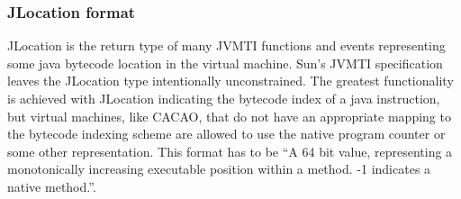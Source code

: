 
\subsubsection{JLocation format}
\label{jlocation}
JLocation is the return type of many JVMTI functions and events representing some java bytecode location in the virtual machine. Sun's JVMTI specification\cite{jvmti} leaves the JLocation type intentionally unconstrained. The greatest functionality is achieved with JLocation indicating the bytecode index of a java instruction, but virtual machines, like CACAO, that do not have an appropriate mapping to the bytecode indexing scheme are allowed to use the native program counter or some other representation. This format has to be ``A 64 bit value, representing a monotonically increasing executable position within a method. -1 indicates a native method.''\cite{jvmti}. 


